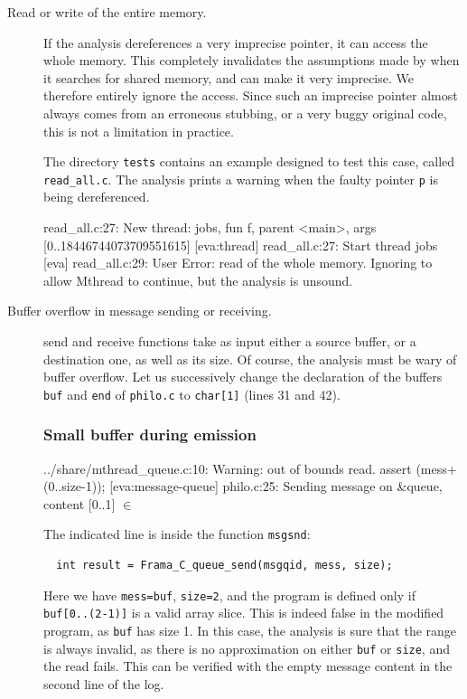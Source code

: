 \documentclass{frama-c-book}
\begin{document}
\begin{description}
\item[Read or write of the entire memory.]  If the \Eva analysis
  dereferences a very imprecise pointer, it can access the whole
  memory.  This completely invalidates the assumptions made by
  \mthread when it searches for shared memory, and can make it very
  imprecise. We therefore entirely ignore the access. Since such an
  imprecise pointer almost always comes from an erroneous stubbing, or
  a very buggy original code, this is not a limitation in practice.

  The directory \verb+tests+ contains an example designed to test this
  case, called \verb+read_all.c+. The \Eva analysis
  prints a warning when the faulty pointer \verb+p+ is being dereferenced.

  \begin{logs} read_all.c:27:
  New thread: jobs, fun f, parent <main>, args [0..18446744073709551615]
[eva:thread] read_all.c:27: Start thread jobs
[eva] read_all.c:29: User Error:
  read of the whole memory. Ignoring to allow Mthread to continue, but the analysis is unsound.
  \end{logs}

\item[Buffer overflow in message sending or receiving.]
\mthread send and receive functions take as input either a source
buffer, or a destination one, as well as its size. Of course, the
\Eva analysis must be wary of buffer overflow. Let us successively
change the declaration of the buffers \verb+buf+ and \verb+end+ of
\verb+philo.c+ to \verb+char[1]+ (lines 31 and 42).
%

\subsubsection{Small buffer during emission}
\begin{logs}
[kernel] ../share/mthread_queue.c:10: Warning: out of bounds read.
                assert \valid(mess+(0..size-1));
[eva:message-queue] philo.c:25: Sending message on &queue, content [0..1] $\in$ {{}}
\end{logs}
The indicated line is inside the function \verb+msgsnd+:
\begin{lstlisting}
  int result = Frama_C_queue_send(msgqid, mess, size);
\end{lstlisting}
Here we have \verb+mess=buf+, \verb+size=2+, and the program is defined only
if  \verb+buf[0..(2-1)]+ is a valid array slice. This
is indeed false in the modified program, as \verb+buf+ has size 1. In
this case, the \Eva analysis is sure that the range is always
invalid, as there is no approximation on either \verb+buf+ or
\verb+size+, and the read fails. This can be verified with the
empty message content in the second line of the log.


\end{description}
\end{document}
